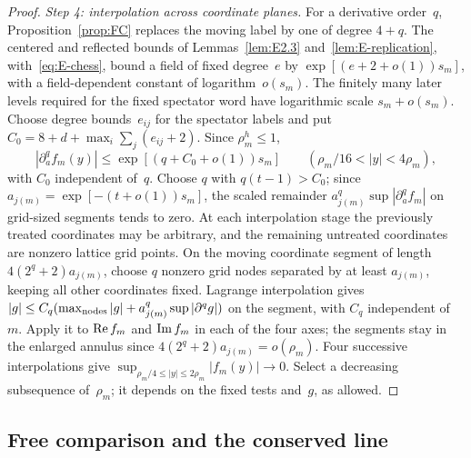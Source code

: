 \begin{proof}
\emph{Step 4: interpolation across coordinate planes.} For a derivative order~$q$, Proposition~\ref{prop:FC} replaces the moving label by one of degree $4+q$. The centered and reflected bounds of Lemmas~\ref{lem:E2.3} and~\ref{lem:E-replication}, with~\eqref{eq:E-chess}, bound a field of fixed degree~$e$ by $\exp[(e+2+o(1))s_m]$, with a field-dependent constant of logarithm~$o(s_m)$. The finitely many later levels required for the fixed spectator word have logarithmic scale $s_m+o(s_m)$. Choose degree bounds~$e_{ij}$ for the spectator labels and put $C_0=8+d+\max_i\sum_j(e_{ij}+2)$. Since $\rho_m^h\le1$,
\begin{equation}\label{eq:G-annular-derivatives}
|\partial_a^q f_m(y)|\le \exp[(q+C_0+o(1))s_m]
\qquad(\rho_m/16<|y|<4\rho_m),
\end{equation}
with $C_0$ independent of~$q$. Choose $q$ with $q(t-1)>C_0$; since $a_{j(m)}=\exp[-(t+o(1))s_m]$, the scaled remainder $a_{j(m)}^q\sup|\partial_a^q f_m|$ on grid-sized segments tends to zero. At each interpolation stage the previously treated coordinates may be arbitrary, and the remaining untreated coordinates are nonzero lattice grid points. On the moving coordinate segment of length $4(2^q+2)a_{j(m)}$, choose $q$ nonzero grid nodes separated by at least $a_{j(m)}$, keeping all other coordinates fixed. Lagrange interpolation gives $|g|\le C_q(\max_{\rm nodes}|g|+a_{j(m)}^q\sup|\partial^qg|)$ on the segment, with $C_q$ independent of~$m$. Apply it to ${\rm Re}\,f_m$ and ${\rm Im}\,f_m$ in each of the four axes; the segments stay in the enlarged annulus since $4(2^q+2)a_{j(m)}=o(\rho_m)$. Four successive interpolations give $\sup_{\rho_m/4\le|y|\le2\rho_m}|f_m(y)|\to0$. Select a decreasing subsequence of~$\rho_m$; it depends on the fixed tests and~$g$, as allowed.
\end{proof}

\subsection{Free comparison and the conserved line}\label{sec:partII-G.2}

